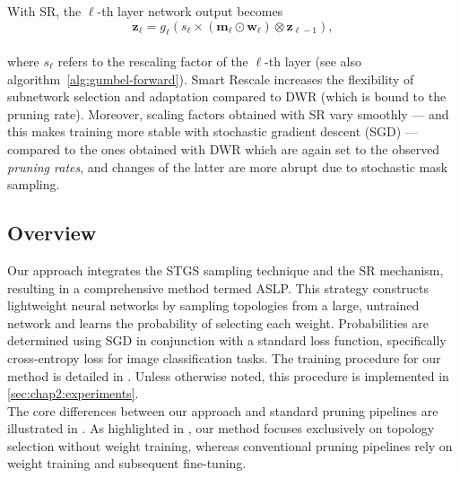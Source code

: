 With SR, the $\ell$-th layer network output becomes \\

  \begin{equation}
   \mathbf{z}_{\ell} = g_\ell(s_\ell \times (\bm{m}_\ell \odot \bm{w}_\ell) \otimes \mathbf{z}_{\ell-1}),
  \end{equation}\\

\noindent where  $s_\ell$ refers to the rescaling factor  of  the $\ell$-th
layer (see also algorithm~\ref{alg:gumbel-forward}).  Smart Rescale increases
the flexibility of subnetwork selection and adaptation compared to DWR (which
is bound to the pruning rate).  Moreover,  scaling factors obtained with SR
vary smoothly  ---  and this makes training more stable with stochastic
gradient descent (SGD) --- compared to the ones obtained with DWR which are
again set to the observed {\it pruning rates},  and changes of the latter are
more abrupt due to stochastic mask sampling. \\


\subsection{Overview}

Our approach integrates the \acl{STGS} sampling technique and the \acl{SR}
mechanism, resulting in a comprehensive method termed \acf{ASLP}. This strategy
constructs lightweight neural networks by sampling topologies from a large,
untrained network and learns the probability of selecting each weight.
Probabilities are determined using \acl{SGD} in conjunction with a standard loss
function, specifically cross-entropy loss for image classification tasks. The
training procedure for our method is detailed in . Unless
otherwise noted, this procedure is implemented in
\cref{sec:chap2:experiments}.\\

The core differences between our approach and standard pruning pipelines are
illustrated in . As
highlighted in , our method focuses exclusively on
topology selection without weight training, whereas conventional pruning
pipelines rely on weight training and subsequent fine-tuning.\\


